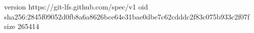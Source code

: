 version https://git-lfs.github.com/spec/v1
oid sha256:2845f09052d0fb8a6a8626bce64e31bae0dbe7c62cdddc2f83c075b933c2f07f
size 265414
